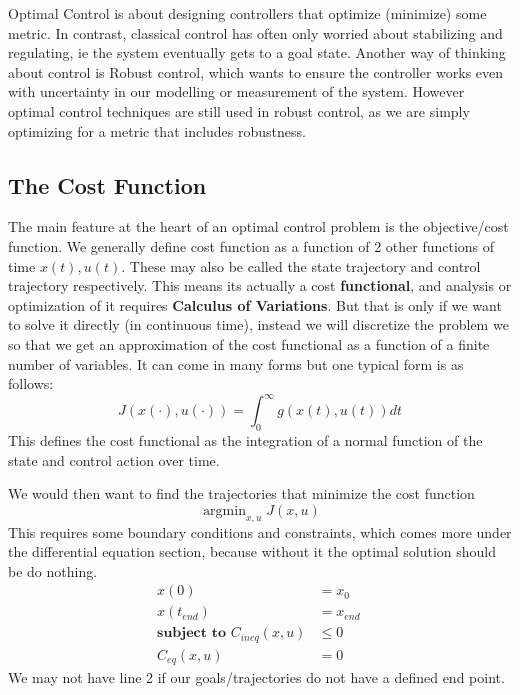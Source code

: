\documentclass[a4paper, 10pt, twocolumn]{article}
\DeclareMathOperator*{\argmin}{argmin}
\begin{document}
Optimal Control is about designing controllers that optimize (minimize) some metric. In contrast, classical control has often only worried about stabilizing and regulating, ie the system eventually gets to a goal state. Another way of thinking about control is Robust control, which wants to ensure the controller works even with uncertainty in our modelling or measurement of the system. However optimal control techniques are still used in robust control, as we are simply optimizing for a metric that includes robustness.

\subsection{The Cost Function}
The main feature at the heart of an optimal control problem is the objective/cost function.
We generally define cost function as a function of 2 other functions of time \(x(t), u(t)\). These may also be called the state trajectory and control trajectory respectively.
This means its actually a cost \textbf{functional}, and analysis or optimization of it requires \textbf{Calculus of Variations}. But that is only if we want to solve it directly (in continuous time), instead we will discretize the problem we so that we get an approximation of the cost functional as a function of a finite number of variables.
It can come in many forms but one typical form is as follows:
\begin{equation*}
    J(x(\cdot), u(\cdot))  = \int_{0}^{\infty } g(x(t), u(t)) dt
\end{equation*}
This defines the cost functional as the integration of a normal function of the state and control action over time.

We would then want to find the trajectories that minimize the cost function
\begin{equation*}
    \argmin_{x, u} J(x, u)
\end{equation*}
This requires some boundary conditions and constraints, which comes more under the differential equation section, because without it the optimal solution should be do nothing.
\begin{align*}
    x(0)           & = x_0       \\
    x(t_{end})\    & = x_{end}\, \\
    \textbf{subject to }
    C_{ineq}(x, u) & \leq 0      \\
    C_{eq}(x, u)   & = 0
\end{align*}
We may not have line 2 if our goals/trajectories do not have a defined end point.
\end{document}
